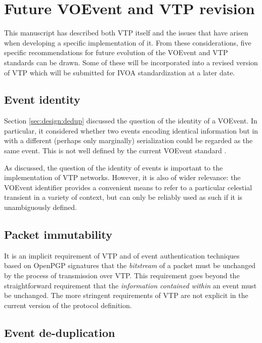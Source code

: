 \documentclass[5p,authoryear]{elsarticle}
\begin{document}
\section{Future VOEvent and VTP revision}
\label{sec:future}

This manuscript has described both VTP itself and the issues that have arisen
when developing a specific implementation of it.  From these considerations,
five specific recommendations for future evolution of the VOEvent and VTP
standards can be drawn. Some of these will be incorporated into a revised
version of VTP which will be submitted for IVOA standardization at a later
date.

\subsection{Event identity}
\label{sec:future:identity}

Section \ref{sec:design:dedup} discussed the question of the identity of a
VOEvent. In particular, it considered whether two events encoding identical
information but in with a different (perhaps only marginally) serialization
could be regarded as the same event. This is not well defined by the current
VOEvent standard \citep{Seaman:2011}.

As discussed, the question of the identity of events is important to the
implementation of VTP networks. However, it is also of wider relevance: the
VOEvent identifier provides a convenient means to refer to a particular
celestial transient in a variety of context, but can only be reliably used as
such if it is unambiguously defined.

\subsection{Packet immutability}
\label{sec:future:immutability}

It is an implicit requirement of VTP and of event authentication techniques
based on OpenPGP signatures that the \textit{bitstream} of a packet must be
unchanged by the process of transmission over VTP. This requirement goes
beyond the straightforward requirement that the \textit{information contained
within} an event must be unchanged. The more stringent requirements of VTP are
not explicit in the current version of the protocol definition.

\subsection{Event de-duplication}
\label{sec:future:dedup}
\end{document}
